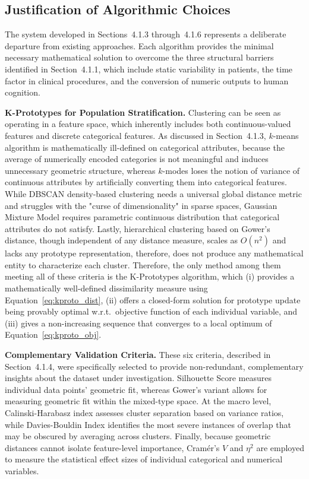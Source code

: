 \subsection{Justification of Algorithmic Choices}

The system developed in Sections~4.1.3 through~4.1.6 represents a deliberate departure from existing approaches. Each algorithm provides the minimal necessary mathematical solution to overcome the three structural barriers identified in Section~4.1.1, which include static variability in patients, the time factor in clinical procedures, and the conversion of numeric outputs to human cognition.

\textbf{K-Prototypes for Population Stratification.} Clustering can be seen as operating in a feature space, which inherently includes both continuous-valued features and discrete categorical features. As discussed in Section~4.1.3, $k$-means algorithm is mathematically ill-defined on categorical attributes, because the average of numerically encoded categories is not meaningful and induces unnecessary geometric structure, whereas $k$-modes loses the notion of variance of continuous attributes by artificially converting them into categorical features. While DBSCAN density-based clustering needs a universal global distance metric and struggles with the "curse of dimensionality" in sparse spaces, Gaussian Mixture Model requires parametric continuous distribution that categorical attributes do not satisfy. Lastly, hierarchical clustering based on Gower's distance, though independent of any distance measure, scales as $O(n^2)$ and lacks any prototype representation, therefore, does not produce any mathematical entity to characterize each cluster. Therefore, the only method among them meeting all of these criteria is the K-Prototypes algorithm, which (i) provides a mathematically well-defined dissimilarity measure using Equation~\eqref{eq:kproto_dist}, (ii) offers a closed-form solution for prototype update being provably optimal w.r.t.\ objective function of each individual variable, and (iii) gives a non-increasing sequence that converges to a local optimum of Equation~\eqref{eq:kproto_obj}.

\textbf{Complementary Validation Criteria.} These six criteria, described in Section~4.1.4, were specifically selected to provide non-redundant, complementary insights about the dataset under investigation. Silhouette Score measures individual data points' geometric fit, whereas Gower's variant allows for measuring geometric fit within the mixed-type space. At the macro level, Calinski-Harabasz index assesses cluster separation based on variance ratios, while Davies-Bouldin Index identifies the most severe instances of overlap that may be obscured by averaging across clusters. Finally, because geometric distances cannot isolate feature-level importance, Cramér's $V$ and $\eta^2$ are employed to measure the statistical effect sizes of individual categorical and numerical variables.

